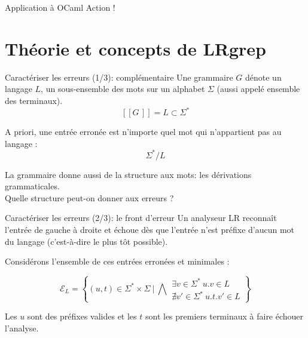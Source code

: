 \documentclass{beamer}          %
\begin{document}
\begin{frame}{Application à OCaml}
  Action !
\end{frame}

\section{Théorie et concepts de LRgrep}

\begin{frame}{Caractériser les erreurs (1/3): complémentaire}
  Une grammaire $G$ dénote un langage $L$, un sous-ensemble des mots sur un alphabet $\Sigma$ (aussi appelé ensemble des terminaux).
  $$
  [\![G\,]\!] = L \subset \Sigma^*
  $$

  \pause
  A priori, une entrée erronée est n'importe quel mot qui n'appartient pas au langage :
  $$
  \Sigma^* / L
  $$

  \pause
  La grammaire donne aussi de la structure aux mots: les dérivations grammaticales.
  \\
  Quelle structure peut-on donner aux erreurs ?
\end{frame}

\begin{frame}{Caractériser les erreurs (2/3): le front d'erreur}
  Un analyseur LR reconnaît l'entrée de gauche à droite et échoue dès que l'entrée n'est préfixe d'aucun mot du langage (c'est-à-dire le plus tôt possible).


  \pause
  Considérons l'ensemble de ces entrées erronées et minimales :

  $$
  \mathcal E_L = \left\{ (u, t) \in \Sigma^*\times\Sigma\ \bigg|\ \bigwedge
  \begin{array}{l}
      \exists v \in \Sigma^* \ u . v \in L \\
      \nexists v' \in \Sigma^* \ u . t . v' \in L
  \end{array}
  \right\}
  $$

  Les $u$ sont des préfixes valides et les $t$ sont les premiers terminaux
  à faire échouer l'analyse.
\end{frame}
\end{document}

